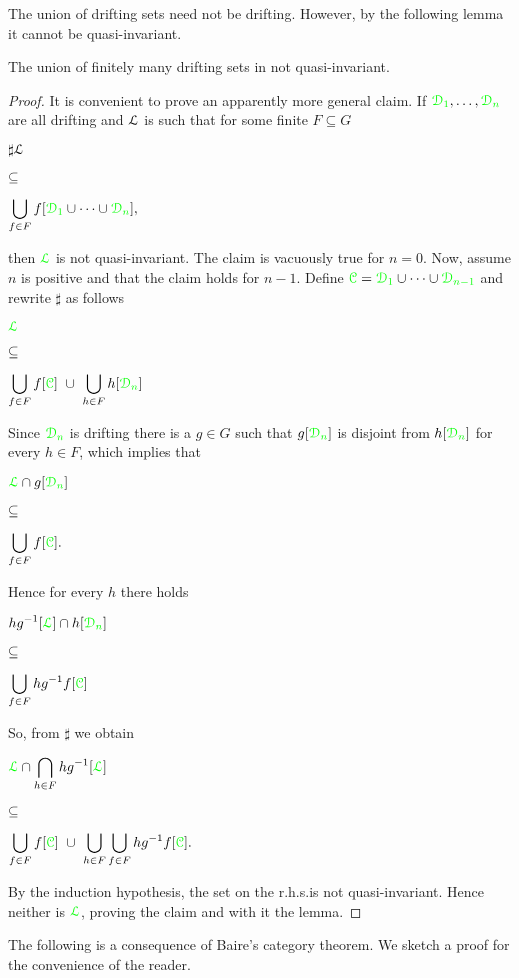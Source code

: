 \documentclass[creche.tex]{subfiles}
\begin{document}
The union of drifting sets need not be drifting. However, by the following lemma it cannot be quasi-invariant.

\begin{lemma}\label{lem_newelski}
The union of finitely many drifting sets in not quasi-invariant.
\end{lemma}


\begin{proof}
\def\medrel#1{\parbox[t]{6ex}{$\displaystyle\hfil #1$}}
\def\ceq#1#2#3{\noindent\parbox[t]{30ex}{$\displaystyle #1$}\medrel{#2}{$\displaystyle #3$}}

It is convenient to prove an apparently more general claim. If ${\color{green}\EuScript D_1},\dots,{\color{green}\EuScript D_n}$ are all drifting and $\EuScript L$ is such that for some finite $F\subseteq G$\medskip 

\ceq{\sharp\hfill\Ll}{\subseteq}{\bigcup_{f\in F}f[{\gr\D_1}\cup\dots\cup{\gr\D_n}],} 

then ${\color{green}\EuScript L}$ is not quasi-invariant. The claim is vacuously true for $n=0$. Now, assume $n$ is positive and that the claim holds for $n-1$. Define ${\color{green}\EuScript C}={\color{green}\EuScript D_1}\cup\dots\cup{\color{green}\EuScript D_{n-1}}$ and rewrite $\sharp$ as follows

\ceq{\hfill{\gr\Ll}}{\subseteq}{\bigcup_{f\in F}f[\grC]\ \cup\ \bigcup_{h\in F}h[{\gr\D_n}]}

Since ${\color{green}\EuScript D_n}$ is drifting there is a $g\in G$ such that $g[{\color{green}\EuScript D_n}]$ is disjoint from $h[{\color{green}\EuScript D_n}]$ for every $h\in F$, which implies that\medskip 

\ceq{\hfill{\gr\Ll}\cap g[{\gr\D_n}]}{\subseteq}{\bigcup_{f\in F}f[\grC].} 

Hence for every $h$ there holds\medskip 

\ceq{\hfill h g^{-1}[{\gr\Ll}]\cap h[{\gr\D_n}]}{\subseteq}{\bigcup_{f\in F}hg^{-1}f[\grC]} 

So, from $\sharp$ we obtain\medskip 

\ceq{\hfill{\gr\Ll}\cap\bigcap_{h\in F}h g^{-1}[{\gr\Ll}]}{\subseteq}{\bigcup_{f\in F}f[\grC]\ \cup\ \bigcup_{h\in F}\bigcup_{f\in F}hg^{-1}f[\grC].}\smallskip


\noindent By the induction hypothesis, the set on the r.h.s.\@ is not quasi-invariant. Hence neither is ${\color{green}\EuScript L}$, proving the claim and with it the lemma.
\end{proof}

The following is a consequence of Baire's category theorem. We sketch a proof for the convenience of the reader.
\end{document}
